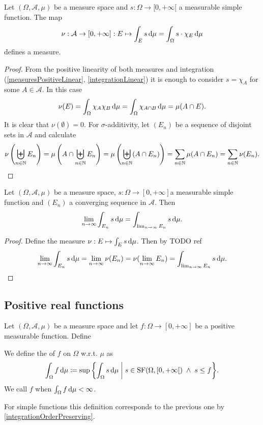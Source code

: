 \begin{proposition}
Let $(\Omega, \mathcal{A}, \mu)$ be a measure space and $s:\Omega\to [0,+\infty[$ a measurable simple function. The map
\[ \nu:\mathcal{A}\to [0,+\infty]: E\mapsto \int_E s\operatorname{d \!}{\mu} = \int_\Omega s\cdot \chi_E\operatorname{d \!}{\mu} \]
defines a measure.
\end{proposition}
\begin{proof}
From the positive linearity of both measures and integration (\ref{measuresPositiveLinear}, \ref{integrationLinear}) it is enough to consider $s = \chi_A$ for some $A\in\mathcal{A}$. In this case
\[ \nu(E) = \int_\Omega\chi_A\chi_B \operatorname{d \!}{\mu} = \int_\Omega\chi_{A\cap B} \operatorname{d \!}{\mu} = \mu(A\cap E). \]
It is clear that $\nu(\emptyset) = 0$. For $\sigma$-additivity, let $(E_n)$ be a sequence of disjoint sets in $\mathcal{A}$ and calculate
\[ \nu\left(\biguplus_{n\in\mathbb{N}}E_n\right) = \mu\left(A\cap \biguplus_{n\in\mathbb{N}}E_n\right) = \mu\left(\biguplus_{n\in\mathbb{N}}(A\cap E_n)\right) = \sum_{n\in\mathbb{N}}\mu(A\cap E_n) = \sum_{n\in\mathbb{N}}\nu(E_n). \]
\end{proof}
\begin{corollary} \label{integralContinuousInDomain}
Let $(\Omega, \mathcal{A}, \mu)$ be a measure space, $s:\Omega\to[0,+\infty]$a measurable simple function and $(E_n)$ a converging sequence in $\mathcal{A}$. Then
\[ \lim_{n\to\infty}\int_{E_n}s\operatorname{d \!}{\mu} = \int_{\lim_{n\to\infty} E_n}s\operatorname{d \!}{\mu}. \]
\end{corollary}
\begin{proof}
Define the measure $\nu: E\mapsto \int_E s\operatorname{d \!}{\mu}$. Then by TODO ref
\[ \lim_{n\to\infty}\int_{E_n}s\operatorname{d \!}{\mu} = \lim_{n\to\infty}\nu(E_n) = \nu(\lim_{n\to\infty}E_n) =\int_{\lim_{n\to\infty}E_n}s\operatorname{d \!}{\mu}. \]
\end{proof}

\subsection{Positive real functions}
\begin{definition}
Let $(\Omega, \mathcal{A}, \mu)$ be a measure space and let $f:\Omega\to[0,+\infty]$ be a positive measurable function. Define

We define the  of $f$ on $\Omega$ w.r.t. $\mu$ as
\[ \int_\Omega f \diff{\mu} \defeq \sup\setbuilder{\int_\Omega s \diff{\mu}}{s\in\SF(\Omega, \interval[co]{0,+\infty})\;\land\; s\leq f}. \]
We call $f$  when $\int_\Omega f \operatorname{d \!}{\mu} < \infty$.
\end{definition}
For simple functions this definition corresponds to the previous one by \ref{integrationOrderPreserving}.

